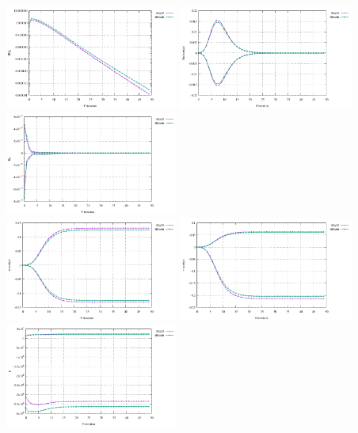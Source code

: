 \begin{center}
\includegraphics[width=5.7cm]{python_codes/fieldstone_87/results/experiment_03/conv}
\includegraphics[width=5.7cm]{python_codes/fieldstone_87/results/experiment_03/du}
\includegraphics[width=5.7cm]{python_codes/fieldstone_87/results/experiment_03/dp}\\
\includegraphics[width=5.7cm]{python_codes/fieldstone_87/results/experiment_03/u}
\includegraphics[width=5.7cm]{python_codes/fieldstone_87/results/experiment_03/v}
\includegraphics[width=5.7cm]{python_codes/fieldstone_87/results/experiment_03/p}\\
\end{center}

